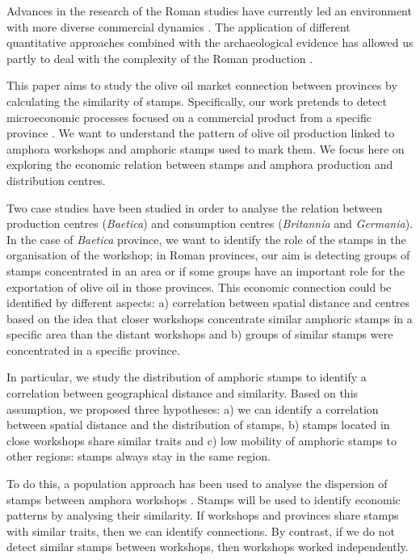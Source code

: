 \documentclass[review]{elsarticle}
\begin{document}
Advances in the research of the Roman studies have currently led an environment with more diverse commercial dynamics \citep{duncan1982economy,
temin_economy_2006,
quantifyingwilson2009}. The application of different quantitative approaches combined with the archaeological evidence has allowed us partly to deal with the complexity of the Roman production \citep{brughmans_roman_2016,
orengo_seeds_2016,bayesian_2018,
coto-sarmiento_identifying_2018,
rubio-campillo_ecology_2018}.


This paper aims to study the olive oil market connection between provinces by calculating the similarity of stamps. Specifically, our work pretends to detect microeconomic processes focused on a commercial product from a specific province \citep{isaksen_network_2006}. We want to understand the pattern of olive oil production linked to amphora workshops and amphoric stamps used to mark them. We focus here on exploring the economic relation between stamps and amphora production and distribution centres. 

Two case studies have been studied in order to analyse the relation between production centres (\textit{Baetica}) and consumption centres (\textit{Britannia} and \textit{Germania}). In the case of \textit{Baetica} province, we want to identify the role of the stamps in the organisation of the workshop; in Roman provinces, our aim is detecting groups of stamps concentrated in an area or if some groups have an important role for the exportation of olive oil in those provinces. This economic connection could be identified by different aspects: a) correlation between spatial distance and centres based on the idea that closer workshops concentrate similar amphoric stamps in a specific area than the distant workshops and b) groups of similar stamps were concentrated in a specific province. 

In particular, we study the distribution of amphoric stamps to identify a correlation between geographical distance and similarity. Based on this assumption, we proposed three hypotheses: a) we can identify a correlation between spatial distance and the distribution of stamps, b) stamps located in close workshops share similar traits and c) low mobility of amphoric stamps to other regions: stamps always stay in the same region.  

To do this, a population approach has been used to analyse the dispersion of stamps between amphora workshops \citep{rubio-campillo_ecology_2018}. Stamps will be used to identify economic patterns by analysing their similarity. If workshops and provinces share stamps with similar traits, then we can identify connections. By contrast, if we do not detect similar stamps between workshops, then workshops worked independently. 
\end{document}
